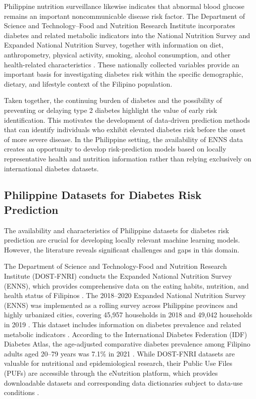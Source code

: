 Philippine nutrition surveillance likewise indicates that abnormal blood glucose remains an important noncommunicable disease risk factor. The Department of Science and Technology--Food and Nutrition Research Institute incorporates diabetes and related metabolic indicators into the National Nutrition Survey and Expanded National Nutrition Survey, together with information on diet, anthropometry, physical activity, smoking, alcohol consumption, and other health-related characteristics \cite{fnri_enutrition}. These nationally collected variables provide an important basis for investigating diabetes risk within the specific demographic, dietary, and lifestyle context of the Filipino population.

Taken together, the continuing burden of diabetes and the possibility of preventing or delaying type 2 diabetes highlight the value of early risk identification. This motivates the development of data-driven prediction methods that can identify individuals who exhibit elevated diabetes risk before the onset of more severe disease. In the Philippine setting, the availability of ENNS data creates an opportunity to develop risk-prediction models based on locally representative health and nutrition information rather than relying exclusively on international diabetes datasets.

\subsection{Philippine Datasets for Diabetes Risk Prediction}

The availability and characteristics of Philippine datasets for diabetes risk prediction are crucial for developing locally relevant machine learning models. However, the literature reveals significant challenges and gaps in this domain.

The Department of Science and Technology-Food and Nutrition Research Institute (DOST-FNRI) conducts the Expanded National Nutrition Survey (ENNS), which provides comprehensive data on the eating habits, nutrition, and health status of Filipinos \cite{dostfnri_enutrition_puf}. The 2018–2020 Expanded National Nutrition Survey (ENNS) was implemented as a rolling survey across Philippine provinces and highly urbanized cities, covering 45,957 households in 2018 and 49,042 households in 2019 \cite{dostfnri_enns_2018_2019}. This dataset includes information on diabetes prevalence and related metabolic indicators \cite{dostfnri_enns_clinical}. According to the International Diabetes Federation (IDF) Diabetes Atlas, the age-adjusted comparative diabetes prevalence among Filipino adults aged 20--79 years was 7.1\% in 2021 \cite{idf_diabetes_atlas_2021}. While DOST-FNRI datasets are valuable for nutritional and epidemiological research, their Public Use Files (PUFs) are accessible through the eNutrition platform, which provides downloadable datasets and corresponding data dictionaries subject to data-use conditions \cite{dostfnri_enutrition_puf}.

